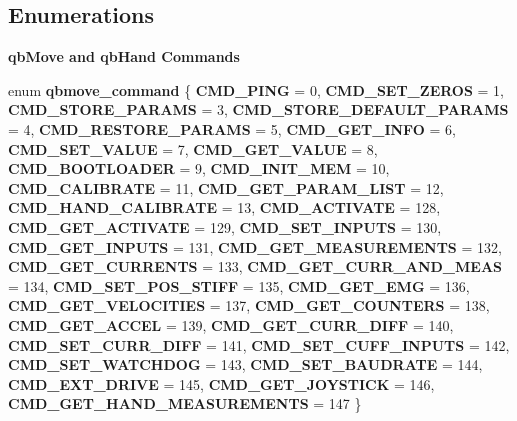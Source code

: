 \subsection*{Enumerations}
\begin{Indent}\textbf{ qb\+Move and qb\+Hand Commands}\par
\begin{DoxyCompactItemize}
\item 
enum \textbf{ qbmove\+\_\+command} \{ \newline
\textbf{ C\+M\+D\+\_\+\+P\+I\+NG} = 0, 
\textbf{ C\+M\+D\+\_\+\+S\+E\+T\+\_\+\+Z\+E\+R\+OS} = 1, 
\textbf{ C\+M\+D\+\_\+\+S\+T\+O\+R\+E\+\_\+\+P\+A\+R\+A\+MS} = 3, 
\textbf{ C\+M\+D\+\_\+\+S\+T\+O\+R\+E\+\_\+\+D\+E\+F\+A\+U\+L\+T\+\_\+\+P\+A\+R\+A\+MS} = 4, 
\newline
\textbf{ C\+M\+D\+\_\+\+R\+E\+S\+T\+O\+R\+E\+\_\+\+P\+A\+R\+A\+MS} = 5, 
\textbf{ C\+M\+D\+\_\+\+G\+E\+T\+\_\+\+I\+N\+FO} = 6, 
\textbf{ C\+M\+D\+\_\+\+S\+E\+T\+\_\+\+V\+A\+L\+UE} = 7, 
\textbf{ C\+M\+D\+\_\+\+G\+E\+T\+\_\+\+V\+A\+L\+UE} = 8, 
\newline
\textbf{ C\+M\+D\+\_\+\+B\+O\+O\+T\+L\+O\+A\+D\+ER} = 9, 
\textbf{ C\+M\+D\+\_\+\+I\+N\+I\+T\+\_\+\+M\+EM} = 10, 
\textbf{ C\+M\+D\+\_\+\+C\+A\+L\+I\+B\+R\+A\+TE} = 11, 
\textbf{ C\+M\+D\+\_\+\+G\+E\+T\+\_\+\+P\+A\+R\+A\+M\+\_\+\+L\+I\+ST} = 12, 
\newline
\textbf{ C\+M\+D\+\_\+\+H\+A\+N\+D\+\_\+\+C\+A\+L\+I\+B\+R\+A\+TE} = 13, 
\textbf{ C\+M\+D\+\_\+\+A\+C\+T\+I\+V\+A\+TE} = 128, 
\textbf{ C\+M\+D\+\_\+\+G\+E\+T\+\_\+\+A\+C\+T\+I\+V\+A\+TE} = 129, 
\textbf{ C\+M\+D\+\_\+\+S\+E\+T\+\_\+\+I\+N\+P\+U\+TS} = 130, 
\newline
\textbf{ C\+M\+D\+\_\+\+G\+E\+T\+\_\+\+I\+N\+P\+U\+TS} = 131, 
\textbf{ C\+M\+D\+\_\+\+G\+E\+T\+\_\+\+M\+E\+A\+S\+U\+R\+E\+M\+E\+N\+TS} = 132, 
\textbf{ C\+M\+D\+\_\+\+G\+E\+T\+\_\+\+C\+U\+R\+R\+E\+N\+TS} = 133, 
\textbf{ C\+M\+D\+\_\+\+G\+E\+T\+\_\+\+C\+U\+R\+R\+\_\+\+A\+N\+D\+\_\+\+M\+E\+AS} = 134, 
\newline
\textbf{ C\+M\+D\+\_\+\+S\+E\+T\+\_\+\+P\+O\+S\+\_\+\+S\+T\+I\+FF} = 135, 
\textbf{ C\+M\+D\+\_\+\+G\+E\+T\+\_\+\+E\+MG} = 136, 
\textbf{ C\+M\+D\+\_\+\+G\+E\+T\+\_\+\+V\+E\+L\+O\+C\+I\+T\+I\+ES} = 137, 
\textbf{ C\+M\+D\+\_\+\+G\+E\+T\+\_\+\+C\+O\+U\+N\+T\+E\+RS} = 138, 
\newline
\textbf{ C\+M\+D\+\_\+\+G\+E\+T\+\_\+\+A\+C\+C\+EL} = 139, 
\textbf{ C\+M\+D\+\_\+\+G\+E\+T\+\_\+\+C\+U\+R\+R\+\_\+\+D\+I\+FF} = 140, 
\textbf{ C\+M\+D\+\_\+\+S\+E\+T\+\_\+\+C\+U\+R\+R\+\_\+\+D\+I\+FF} = 141, 
\textbf{ C\+M\+D\+\_\+\+S\+E\+T\+\_\+\+C\+U\+F\+F\+\_\+\+I\+N\+P\+U\+TS} = 142, 
\newline
\textbf{ C\+M\+D\+\_\+\+S\+E\+T\+\_\+\+W\+A\+T\+C\+H\+D\+OG} = 143, 
\textbf{ C\+M\+D\+\_\+\+S\+E\+T\+\_\+\+B\+A\+U\+D\+R\+A\+TE} = 144, 
\textbf{ C\+M\+D\+\_\+\+E\+X\+T\+\_\+\+D\+R\+I\+VE} = 145, 
\textbf{ C\+M\+D\+\_\+\+G\+E\+T\+\_\+\+J\+O\+Y\+S\+T\+I\+CK} = 146, 
\newline
\textbf{ C\+M\+D\+\_\+\+G\+E\+T\+\_\+\+H\+A\+N\+D\+\_\+\+M\+E\+A\+S\+U\+R\+E\+M\+E\+N\+TS} = 147
 \}
\end{DoxyCompactItemize}
\end{Indent}
